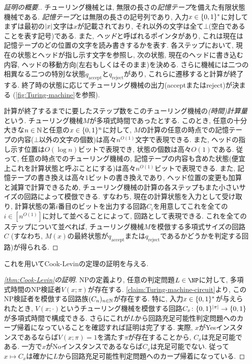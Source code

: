 \begin{proof}[証明の概要.]
  チューリング機械とは, 無限の長さの\emph{記憶テープ}を備えた有限状態機械である.
  \emph{記憶テープ}とは無限の長さの記号列であり, 入力$x\in\{0,1\}^*$に対して
  まずは最初の$\abs{x}$文字は$x$が記載されており, それ以外の文字は全て$\bot$(空白であることを表す記号)である.
  また, \emph{ヘッド}と呼ばれるポインタがあり, これは現在は記憶テープのどの位置の文字を読み書きするかを表す.
  各ステップにおいて, 現在の状態とヘッドが指し示す文字を参照し, 次の状態, 現在のヘッドに書き込む内容, ヘッドの移動方向(左右もしくはそのまま)を決める.
  さらに機械には二つの相異なる二つの特別な状態$q_{\mathrm{accept}}$と$q_{\mathrm{reject}}$があり, これらに遷移すると計算が終了する. 終了時の状態に応じてチューリング機械の出力(acceptまたはreject)が決まる (\cref{fig:Turing-machine}を参照).
  
  計算が終了するまでに要したステップ数をこのチューリング機械の\emph{(時間)計算量}という.
  チューリング機械$M$が多項式時間であったとする. このとき, 任意の十分大きな$n\in\mathbb{N}$と任意の$x\in\{0,1\}^n$に対して, $M$の計算の任意の時点での記憶テープの内容($\bot$以外の文字の個数)は高々$n^{O(1)}$文字で表現できる.
  また, ヘッドの指し示す位置は$O(\log n)$ビットで表現でき, 状態の個数は高々$O(1)$である.
  従って, 任意の時点でのチューリング機械の, 記憶テープの内容も含めた状態(便宜上これを計算状態と呼ぶことにする)は高々$n^{O(1)}$ビットで表現できる.
  また, 記憶テープの書き換えは高々$1$ビットの書き換えであり, ヘッド位置の変更も加算と減算で計算できるため,
  チューリング機械の計算の各ステップもまた小さいサイズの回路によって模倣できる. すなわち, 現在の計算状態を入力として受け取り, 計算状態の第$i$番目のビットを出力する回路$C_i$を用意してこれを全ての$i\in[n^{O(1)}]$に対して並べることによって, 回路として表現できる.
  これを全てのステップについて並べれば, チューリング機械$M$を模倣する多項式サイズの回路$C$ (すなわち, $M(x)$の最終状態が$q_{\mathrm{accept}}$または$q_{\mathrm{reject}}$であるかどうかを判定する回路)が得られる.
\end{proof}

これを用いてCook-Levinの定理の証明を与える.

\begin{proof}[\cref{thm:Cook-Levin}の証明]
  NPの定義より, 任意の判定問題$L\in\NP$に対して, 多項式時間のNP検証者$V(x;\pi)$が存在する.
  \cref{claim:Turing-machine-circuit}より, このNP検証者を模倣する回路族$(C_n)_{n\in\mathbb{N}}$が存在する.
  特に, 入力$x\in\{0,1\}^*$が与えられたとき, $V(x;\cdot)$というチューリング機械を模倣する回路$C_x\colon\{0,1\}^{\abs{\pi}}\to\{0,1\}$が多項式時間で構成できる.
  さらにこれが$L$から回路充足可能性判定問題へのカープ帰着になっていることを確認すれば証明は完了する.
  実際, $x$がYesインスタンスであるならば$V(x;\pi)=1$を満たす$\pi$が存在することから, $C_x$は充足可能である.
  一方で$x$がNoインスタンスであるならば$C_x$は充足可能でない.
  従って$x\mapsto C_x$は確かに$L$から回路充足可能性判定問題へのカープ帰着になっている.
\end{proof}

